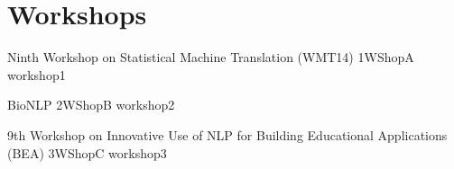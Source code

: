\chapter[Workshops: Thursday--Friday, \daydate]{Workshops}
\thispagestyle{emptyheader}
\vfill




\clearpage
{}

\begin{wsschedule}
  {Ninth Workshop on Statistical Machine Translation (WMT14)}
  {1}{WShopA}
  {workshop1}
  {\WShopLocA}
  
\end{wsschedule}
        
\begin{wsschedule}
  {BioNLP}
  {2}{WShopB}
  {workshop2}
  {\WShopLocB}
  
\end{wsschedule}



\begin{wsschedule}
  {9th Workshop on Innovative Use of NLP for Building Educational Applications (BEA)}
  {3}{WShopC}
  {workshop3}
  {\WShopLocC}
  \clearpage
\end{wsschedule}

